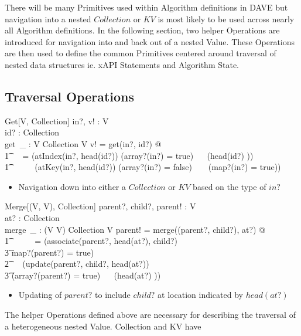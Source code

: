 \documentclass[../main.tex]{subfiles}
\begin{document}
There will be many Primitives used within Algorithm definitions in DAVE but
navigation into a nested $Collection$ or $KV$ is most likely to be used
across nearly all Algorithm definitions. In the following section,
two helper Operations are introduced for navigation into and back out of a
nested Value. These Operations are then used to define the common Primitives centered around
traversal of nested data structures ie. xAPI Statements and Algorithm State.

\subsection{Traversal Operations}
\begin{schema}{Get[V, Collection]}
  in?, v! : V \\
  id? : Collection \\
  get~\_ : V \cross Collection \surj V
  \where
  v! = get(in?, id?) @\\
  \t1 \ ~  = (atIndex(in?, head(id?)) \iff (array?(in?) = true) ~\land~ (head(id?) \in \nat)) ~\lor \\
  \t1 \ \ \ \ ~ (atKey(in?, head(id?)) \iff (array?(in?) = false) ~ \land ~ (map?(in?) = true))
\end{schema}
\begin{itemize}
  \item Navigation down into either a $Collection$ or $KV$ based on the type of $in?$
\end{itemize}
\begin{schema}{Merge[(V, V), Collection]}
  parent?, child?, parent! : V \\
  at? : Collection \\
  merge~\_ : (V \cross V) \cross Collection \bij V
  \where
  parent! = merge((parent?, child?), at?) @ \\
  \t1 \ \ \ \ ~ = (associate(parent?, head(at?), child?) \\
  \t3 \iff map?(parent?) = true) ~ \lor \\
  \t2 \ ~ (update(parent?, child?, head(at?)) \\
  \t3 \iff (array?(parent?) = true) ~\land~ (head(at?) \in \nat))
\end{schema}
\begin{itemize}
  \item Updating of $parent?$ to include $child?$ at location indicated by $head(at?)$
\end{itemize}
The helper Operations defined above are necessary for describing
the traversal of a heterogeneous nested Value. Collection and KV have
\end{document}
